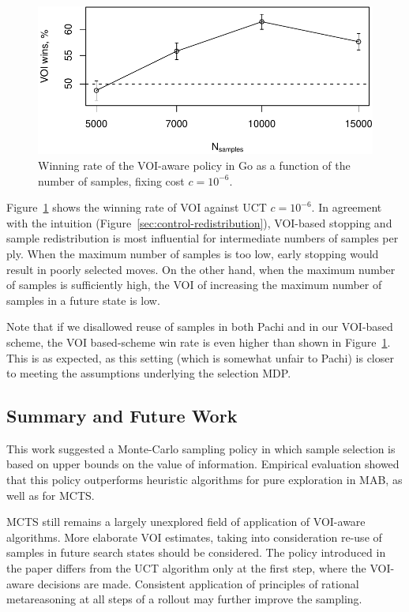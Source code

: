 \begin{figure}[h!]
\centering
\includegraphics[scale=0.55]{mcts-voi-wins.pdf}
\caption{Winning rate of the VOI-aware policy in Go as a function of the number of samples, fixing cost $c=10^{-6}$.}
\label{fig:voi-wins}
\end{figure}

Figure~\ref{fig:voi-wins}
shows the winning rate of VOI against UCT $c=10^{-6}$. In agreement with the intuition
(Figure~\ref{sec:control-redistribution}), VOI-based stopping and
sample redistribution is most influential for intermediate numbers of
samples per ply. When the maximum number of samples is too low, early
stopping would result in poorly selected moves. On the other hand,
when the maximum number of samples is sufficiently high, the VOI of
increasing the maximum number of samples in a future state is low.

Note that if we disallowed reuse of samples in both Pachi and
in our VOI-based scheme, the VOI based-scheme
win rate is even higher than shown in Figure~\ref{fig:voi-wins}. This is as expected,
as this setting (which is somewhat unfair to Pachi) is closer to
meeting the assumptions underlying the selection MDP.

\subsection{Summary and Future Work}

This work suggested a Monte-Carlo sampling policy in which sample
selection is based on upper bounds on the value of
information. Empirical evaluation showed that this policy outperforms
heuristic algorithms for pure exploration in MAB, as well as for MCTS.

MCTS still remains a largely unexplored field of
application of VOI-aware algorithms. More elaborate VOI estimates,
taking into consideration re-use of samples in future search states
should be considered. The policy introduced in the paper differs from
the UCT algorithm only at the first step, where the VOI-aware
decisions are made. Consistent application of principles of rational
metareasoning at all steps of a rollout may further improve the
sampling.

